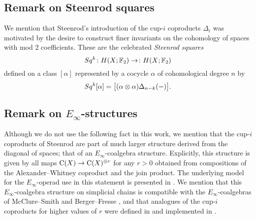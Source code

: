 %

\subsection{Remark on Steenrod squares}
\label{ss:steenrod squares}

We mention that Steenrod's introduction of the cup-$i$ coproducts $\Delta_i$ was motivated by the desire to construct finer invariants on the cohomology of spaces with mod 2 coefficients.
These are the celebrated \textit{Steenrod squares}
\[
Sq^k \colon H(X; {\mathbb{F}_2}) \to \colon H(X; {\mathbb{F}_2})
\]
defined on a class $[\alpha]$ represented by a cocycle $\alpha$ of cohomological degree $n$ by
\[
Sq^k [\alpha] = \big[ (\alpha \otimes \alpha) \Delta_{n-k}(-) \big].
\]

\subsection{Remark on $E_\infty$-structures}

Although we do not use the following fact in this work, we mention that the cup-$i$ coproducts of Steenrod are part of much larger structure derived from the diagonal of spaces; that of an $E_\infty$-coalgebra structure.
Explicitly, this structure is given by all maps $\operatorname{C}(X) \to \operatorname{C}(X)^{\otimes r}$ for any $r > 0$ obtained from compositions of the Alexander--Whitney coproduct and the join product.
The underlying model for the $E_\infty$-operad use in this statement is presented in \cite{medina2020prop1, medina2021prop2}.
We mention that this $E_\infty$-coalgebra structure on simplicial chains is compatible with the $E_\infty$-coalgebras of McClure--Smith \cite{mcclure2003multivariable} and Berger--Fresse \cite{berger2004combinatorial}, and that analogues of the cup-$i$ coproducts for higher values of $r$ were defined in \cite{medina2021may_st} and implemented in \cite{medina2021comch}.

